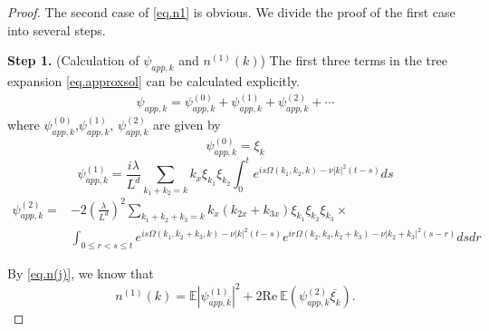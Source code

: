 \begin{proof} The second case of \eqref{eq.n1} is obvious. We divide the proof of the first case into several steps.

\textbf{Step 1.} (Calculation of $\psi_{app,k}$ and $n^{(1)}(k)$) The first three terms in the tree expansion \eqref{eq.approxsol} can be calculated explicitly. 
\begin{equation}
\begin{split}
    \psi_{app,k}=\psi^{(0)}_{app,k}+\psi^{(1)}_{app,k}+\psi^{(2)}_{app,k}+\cdots
\end{split}
\end{equation}
where $\psi^{(0)}_{app,k}$,$\psi^{(1)}_{app,k}$, $\psi^{(2)}_{app,k}$ are given by
\begin{equation}
    \psi^{(0)}_{app,k}=\xi_k
\end{equation}
\begin{equation}
    \psi^{(1)}_{app,k}=\frac{i\lambda}{L^{d}} \sum\limits_{k_1+k_2=k} k_{x}\xi_{k_1} \xi_{k_2} \int^{t}_0e^{i s\Omega(k_1,k_2,k)- \nu|k|^2(t-s)} ds
\end{equation}
\begin{equation}
\begin{split}
    \psi^{(2)}_{app,k}=&-2\left(\frac{\lambda}{L^{d}}\right)^2 \sum\limits_{k_1+k_2+k_3=k} k_{x}(k_{2x}+k_{3x})\xi_{k_1} \xi_{k_2}\xi_{k_3}\times
    \\
    &\int_{0\le r<s\le t}e^{i s\Omega(k_1,k_2+k_3,k)- \nu|k|^2(t-s)} e^{i r\Omega(k_2,k_3,k_2+k_3)- \nu|k_2+k_3|^2(s-r)} dsdr
\end{split}
\end{equation}

By \eqref{eq.n(j)}, we know that
\begin{equation}\label{eq.n(1)}
    n^{(1)}(k)=\mathbb E \left|\psi^{(1)}_{app,k}\right|^2+ 2\text{Re}\  \mathbb E \left(\psi^{(2)}_{app,k}\overline{\xi_k}\right).
\end{equation}


\end{proof}
